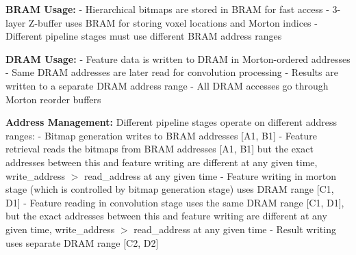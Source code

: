 \documentclass[12pt]{article}
\begin{document}
\textbf{BRAM Usage:}
- Hierarchical bitmaps are stored in BRAM for fast access
- 3-layer Z-buffer uses BRAM for storing voxel locations and Morton indices
- Different pipeline stages must use different BRAM address ranges

\textbf{DRAM Usage:}
- Feature data is written to DRAM in Morton-ordered addresses
- Same DRAM addresses are later read for convolution processing
- Results are written to a separate DRAM address range
- All DRAM accesses go through Morton reorder buffers

\textbf{Address Management:}
Different pipeline stages operate on different address ranges:
- Bitmap generation writes to BRAM addresses [A1, B1]
\newline
- Feature retrieval reads the bitmaps from BRAM addresses [A1, B1] but the exact addresses between this and feature writing are different at any given time, write\_address $>$ read\_address
 at any given time
 \newline
- Feature writing in morton stage (which is controlled by bitmap generation stage) uses DRAM range [C1, D1]
\newline
- Feature reading in convolution stage uses the same DRAM range [C1, D1], but the exact addresses between this and feature writing are different at any given time, write\_address $>$ read\_address
 at any given time
 \newline
- Result writing uses separate DRAM range [C2, D2]
\end{document}
